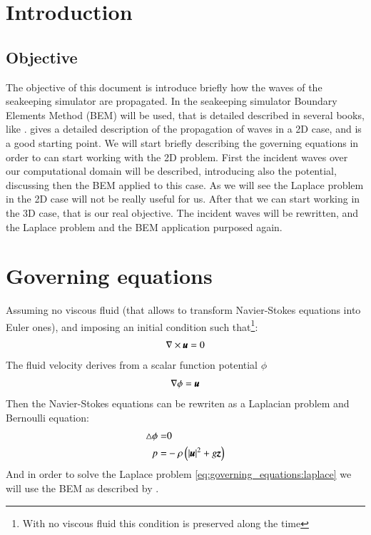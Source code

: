 \chapter{Introduction}
\label{s:introduction}
%
\section{Objective}
%
The objective of this document is introduce briefly how the waves of the
seakeeping simulator are propagated.\rc
%
In the seakeeping simulator Boundary Elements Method (BEM) will be used,
that is detailed described in several books, like \citet{bem_2007}.
\citet{vinayan2007} gives a detailed description of the propagation
of waves in a 2D case, and is a good starting point.\rc
%
We will start briefly describing the governing equations in order to can
start working with the 2D problem. First the incident waves over our
computational domain will be described, introducing also the potential,
discussing then the BEM applied to this case. As we will see the Laplace
problem in the 2D case will not be really useful for us.\rc
%
After that we can start working in the 3D case, that is our real objective.
The incident waves will be rewritten, and the Laplace problem and the BEM
application purposed again.
%
\chapter{Governing equations}
\label{s:governing_equations}
%
Assuming no viscous fluid (that allows to transform Navier-Stokes
equations into Euler ones), and imposing an initial condition such
that\footnote{With no viscous fluid this condition is preserved along the
time}:
%
\begin{eqnarray}
	\rotational \bs{u} = 0
\end{eqnarray}
%
The fluid velocity derives from a scalar function potential $\phi$
%
\begin{eqnarray}
	\label{eq:governing_equations:v_potential}
	\gradient \phi = \bs{u}
\end{eqnarray}
%
Then the Navier-Stokes equations can be rewriten as a Laplacian problem
and Bernoulli equation:
%
\begin{eqnarray}
	\label{eq:governing_equations:laplace}
	\laplacian \phi = & 0
	\\
	\label{eq:governing_equations:bernoulli}
	p = & - \rho \left( \vert \bs{u} \vert^2 + g \bs{z} \right)
\end{eqnarray}
%
And in order to solve the Laplace problem \ref{eq:governing_equations:laplace}
we will use the BEM as described by \citet{bem_2007}.
%